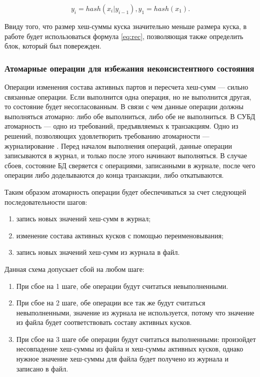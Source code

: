 \begin{equation}
\label{eq:rec}
y_i = hash(x_i|y_{i-1}), y_1 = hash(x_1).
\end{equation}

Ввиду того, что размер хеш-суммы куска значительно меньше размера куска, в работе будет использоваться формула \ref{eq:rec}, позволяющая также определить блок, который был повережден.

\subsubsection{Атомарные операции для избежания неконсистентного состояния}

Операции изменения состава активных партов и пересчета хеш-сумм --- сильно связанные операции. Если выполнится одна операция, но не выполнится другая, то состояние будет несогласованным. В связи с чем данные операции должны выполняться атомарно: либо обе выполниться, либо обе не выполниться. В СУБД атомарность \cite{atomicity} --- одно из требований, предъявляемых к транзакциям. Одно из решений, позволяющих удовлетворить требованию атомарности --- журналирование \cite{journaldbms}. Перед началом выполнения операций, данные операции записываются в журнал, и только после этого начинают выполняться. В случае сбоев, состояние БД сверяется с операциями, записанными в журнале, после чего операции либо доделываются до конца транзакции, либо откатываются.

Таким образом атомарность операции будет обеспечиваться за счет следующей последовательности шагов:
\begin{enumerate}
	\item запись новых значений хеш-сумм в журнал;
	\item изменение состава активных кусков с помощью переименовывания;
	\item запись новых значений хеш-сумм из журнала в файл.
\end{enumerate}

Данная схема допускает сбой на любом шаге:
\begin{enumerate}
	\item При сбое на 1 шаге, обе операции будут считаться невыполненными.
	\item При сбое на 2 шаге, обе операции все так же будут считаться невыполненными, значение из журнала не используется, потому что значение из файла будет соответствовать составу активных кусков.
	\item При сбое на 3 шаге обе операции будут считаться выполненными: произойдет несовпадение хеш-суммы из файла и хеш-суммы активных кусков, однако нужное значение хеш-суммы для файла будет получено из журнала и записано в файл.
\end{enumerate}

